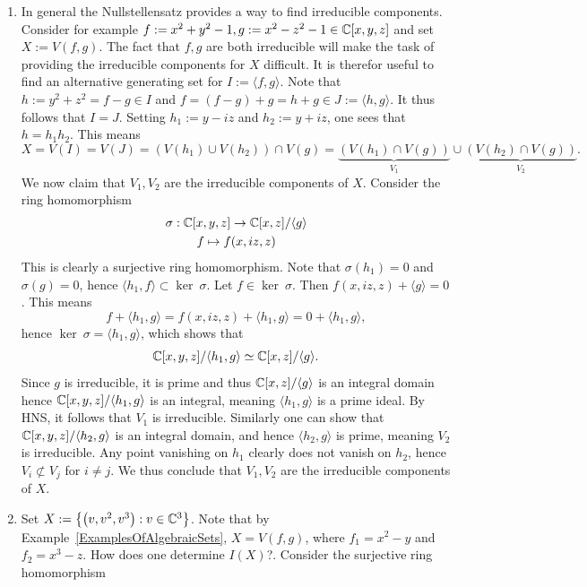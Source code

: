 \begin{example}\label{HNSForDecomposition}
    \begin{enumerate}
        \item In general the Nullstellensatz provides a way to find irreducible components. Consider for example $f:=x^2+y^2-1,g:= x^2-z^2-1\in \mathbb{C}[x,y,z]$ and set $X:= V(f,g)$. The fact that $f,g$ are both irreducible will make the task of providing the irreducible components for $X$ difficult. It is therefor useful to find an alternative generating set for $I:= \langle f,g\rangle$. Note that $h:= y^2+z^2= f-g \in I$ and $f = (f-g)+g = h+g\in J:= \langle h,g\rangle $. It thus follows that $I=J$. Setting $h_1 := y-iz$ and $h_2 := y+iz$, one sees that $h = h_1h_2$. This means
    $$X = V(I)=V(J) = \left(V(h_1)\cup V(h_2)\right) \cap V(g) = \underbrace{\left(V(h_1)\cap V(g)\right)}_{V_1}\cup \underbrace{\left(V(h_2)\cap V(g)\right)}_{V_2}.$$
    We now claim that $V_1,V_2$ are the irreducible components of $X$. Consider the ring homomorphism 
    \begin{gather*}
        \sigma : \mathbb{C}[x,y,z]\rightarrow \mathbb{C}[x,z]/\langle g\rangle\\
        f\mapsto f(x,iz,z)
    \end{gather*}
     This is clearly a surjective ring homomorphism. Note that $\sigma(h_1)=0$ and $\sigma(g)=0$, hence $\langle h_1,f\rangle \subset \ker\ \sigma$. Let $f\in \ker\ \sigma$. Then $f(x,iz,z)+\langle g\rangle = 0$. This means
     $$f+\langle h_1,g\rangle = f(x,iz,z) + \langle h_1,g\rangle = 0 + \langle h_1,g\rangle,$$
    hence $\ker \ \sigma = \langle h_1,g\rangle$, which shows that 
    $$\mathbb{C}[x,y,z]/\langle h_1,g\rangle \simeq \mathbb{C}[x,z]/\langle g\rangle.$$
    Since $g$ is irreducible, it is prime and thus $\mathbb{C}[x,z]/\langle g\rangle$ is an integral domain hence $\mathbb{C}[x,y,z]/\langle h_1,g\rangle $ is an integral, meaning $\langle h_1,g\rangle$ is a prime ideal. By HNS, it follows that $V_1$ is irreducible. Similarly one can show that $\mathbb{C}[x,y,z]/\langle h_2,g\rangle$ is an integral domain, and hence $\langle h_2,g\rangle$ is prime, meaning $V_2$ is irreducible. Any point vanishing on $h_1$ clearly does not vanish on $h_2$, hence $V_i\not\subset V_j$ for $i\neq j$. We thus conclude that $V_1,V_2$ are the irreducible components of $X$.
    \item Set $X := \left\{ \left(v,v^2,v^3\right) : v \in \mathbb{C}^3 \right\}$. Note that by Example~\ref{ExamplesOfAlgebraicSets}, $X=V(f,g)$, where $f_1=x^2-y$ and $f_2=x^3-z$. How does one determine $I(X)$?. Consider the surjective ring homomorphism

\end{enumerate}
\end{example}
